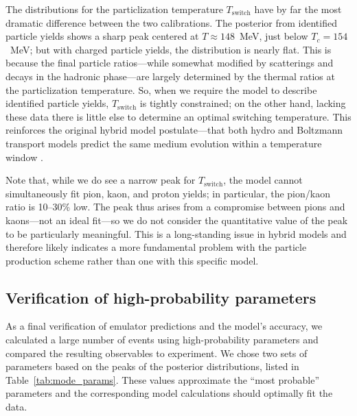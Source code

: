 \documentclass[aps,prc,reprint,amsmath,nofootinbib,noeprint]{revtex4-1}
\begin{document}
The distributions for the particlization temperature $T_\text{switch}$ have by far the most dramatic difference between the two calibrations.
The posterior from identified particle yields shows a sharp peak centered at $T \approx 148$~MeV, just below $T_c = 154$~MeV;
but with charged particle yields, the distribution is nearly flat.
This is because the final particle ratios---while somewhat modified by scatterings and decays in the hadronic phase---are largely determined by the thermal ratios at the particlization temperature.
So, when we require the model to describe identified particle yields, $T_\text{switch}$ is tightly constrained;
on the other hand, lacking these data there is little else to determine an optimal switching temperature.
This reinforces the original hybrid model postulate---that both hydro and Boltzmann transport models predict the same medium evolution within a temperature window \cite{Bass:2000ib,Nonaka:2006yn,Petersen:2008dd}.

Note that, while we do see a narrow peak for $T_\text{switch}$, the model cannot simultaneously fit pion, kaon, and proton yields;
in particular, the pion/kaon ratio is 10--30\% low.
The peak thus arises from a compromise between pions and kaons---not an ideal fit---so we do not consider the quantitative value of the peak to be particularly meaningful.
This is a long-standing issue in hybrid models \cite{Song:2013qma} and therefore likely indicates a more fundamental problem with the particle production scheme rather than one with this specific model.

\subsection{Verification of high-probability parameters}

As a final verification of emulator predictions and the model's accuracy, we calculated a large number of events using high-probability parameters and compared the resulting observables to experiment.
We chose two sets of parameters based on the peaks of the posterior distributions, listed in Table~\ref{tab:mode_params}.
These values approximate the ``most probable'' parameters and the corresponding model calculations should optimally fit the data.
\end{document}
